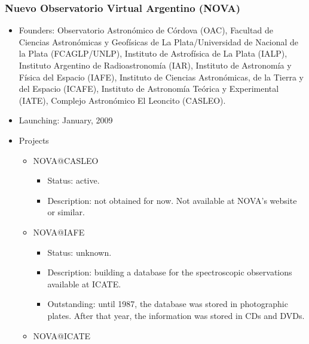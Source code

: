 \documentclass[11pt]{article}
\begin{document}
             \subsubsection{Nuevo Observatorio Virtual Argentino (NOVA)}
                 \begin{itemize}
                     \item Founders: Observatorio Astron\'{o}mico de C\'{o}rdova
(OAC), Facultad de Ciencias Astron\'{o}micas y Geof\'{i}sicas de La
Plata/Universidad de Nacional de la Plata (FCAGLP/UNLP), Instituto de
Astrof\'{i}sica de La Plata (IALP), Instituto Argentino de Radioastronom\'{i}a
(IAR), Instituto de Astronom\'{i}a y F\'{i}sica del Espacio (IAFE), Instituto de
Ciencias Astron\'{o}micas, de la Tierra y del Espacio (ICAFE), Instituto de
Astronom\'{i}a Te\'{o}rica y Experimental (IATE), Complejo Astron\'{o}mico El
Leoncito (CASLEO).
                     \item Launching: January, 2009
                     \item Projects
                          \begin{itemize}
                              \item NOVA@CASLEO
                                  \begin{itemize}
                                      \item Status: active.
                                      \item Description: not obtained for now.
Not available at NOVA's website or similar.
                                  \end{itemize}
                              \item NOVA@IAFE
                                  \begin{itemize}
                                      \item Status: unknown.
                                      \item Description: building a database for
the spectroscopic observations available at ICATE.
                                      \item Outstanding: until 1987, the
database was stored in photographic plates. After that
year, the information was stored in CDs and DVDs.
                                  \end{itemize}
                              \item NOVA@ICATE
                                  \begin{itemize}

\end{itemize}
\end{itemize}
\end{itemize}
\end{document}
